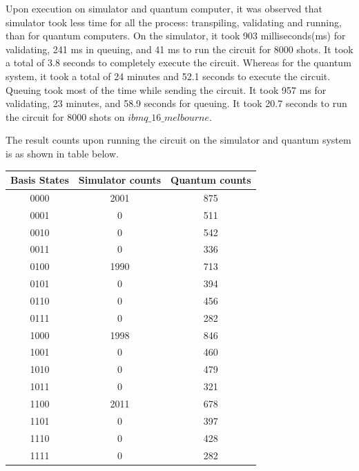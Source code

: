 Upon execution on simulator and quantum computer, it was observed that simulator took less time for all the process: transpiling, validating and running, than for quantum computers. On the simulator, it took 903 milliseconds(ms) for validating, 241 ms in queuing, and 41 ms to run the circuit for 8000 shots. It took a total of 3.8 seconds to completely execute the circuit.
Whereas for the quantum system, it took a total of 24 minutes and 52.1 seconds to execute the circuit. Queuing took most of the time while sending the circuit. It took 957 ms for validating, 23 minutes, and 58.9 seconds for queuing. It took 20.7 seconds to run the circuit for 8000 shots on $ibmq\_16\_melbourne$. 

The result counts upon running the circuit on the simulator and quantum system is as shown in table below.
\begin{table}[h]
\begin{tabular}{|c|c|c|}
\hline
Basis States & Simulator counts & Quantum counts \\ \hline
0000         & 2001             & 875            \\ \hline
0001         & 0                & 511            \\ \hline
0010         & 0                & 542            \\ \hline
0011         & 0                & 336            \\ \hline
0100         & 1990             & 713            \\ \hline
0101         & 0                & 394            \\ \hline
0110         & 0                & 456            \\ \hline
0111         & 0                & 282            \\ \hline
1000         & 1998             & 846            \\ \hline
1001         & 0                & 460            \\ \hline
1010         & 0                & 479            \\ \hline
1011         & 0                & 321            \\ \hline
1100         & 2011             & 678            \\ \hline
1101         & 0                & 397            \\ \hline
1110         & 0                & 428            \\ \hline
1111         & 0                & 282            \\ \hline
\end{tabular}
\end{table}

